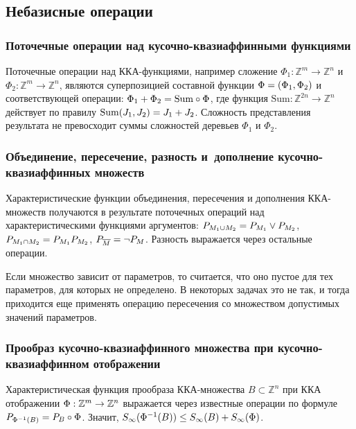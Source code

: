 \begin{multicols}{2}
\subsection{Небазисные операции} %

\subsubsection{Поточечные операции над кусочно-квазиаффинными функциями} 

Поточечные операции над ККА-функциями, например сложение 
$\Phi_1:\mathbb{Z}^m\to\mathbb{Z}^n$ и
$\Phi_2:\mathbb{Z}^m\to\mathbb{Z}^n$, являются суперпозицией
составной функции $\Phi\hm=(\Phi_1, \Phi_2)$ и соответствующей
операции: $\Phi_1+\Phi_2\hm= \mathrm{Sum} \circ \Phi$, где функция
$\mathrm{Sum}:\mathbb{Z}^{2n}\to\mathbb{Z}^n$ действует по правилу
$\mathrm{Sum}(J_1,J_2)\hm=J_1+J_2$. Сложность представления результата
не превосходит суммы сложностей деревьев $\Phi_1$ и $\Phi_2$.

\subsubsection{Объединение, пересечение, разность и~дополнение
кусочно-квазиаффинных множеств} %

Характеристические функции объединения, пересечения и дополнения
ККА-множеств получаются в результате поточечных операций над
характеристическими функциями аргументов: $P_{M_1\cup M_2} \hm= P_{M_1}
\vee P_{M_2}$, $P_{M_1\cap M_2} \hm= P_{M_1} P_{M_2}$, $P_{\overline M}
\hm= \neg P_{M}$. Разность выражается через остальные операции.

Если множество зависит от параметров, то считается, что оно пустое
для тех параметров, для которых не определено. В некоторых задачах
это не так, и тогда приходится еще применять операцию пересечения со
множеством допустимых значений параметров.

\subsubsection{Прообраз кусочно-квазиаффинного 
множества при кусочно-квазиаффинном отображении} %

Характеристическая функция прообраза ККА-мно\-же\-ст\-ва $B\subset
\mathbb{Z}^n$ при ККА отображении
$\Phi:\mathbb{Z}^m\hm\to\mathbb{Z}^n$ выражается через известные
операции по формуле $P_{\Phi^{-1}(B)} \hm= P_B\circ \Phi$. Значит,
$S_\infty(\Phi^{-1}(B)) \hm\leq S_\infty(B)\hm+S_\infty(\Phi)$.



\end{multicols}
